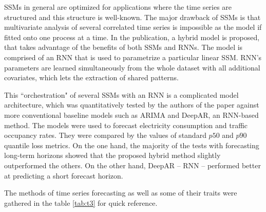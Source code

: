 \documentclass[3p,times,procedia]{elsarticle}
\begin{document}
\begin{enumerate}
SSMs in general are optimized for applications where the time series are structured and this structure is well-known. The major drawback of SSMs is that multivariate analysis of several correlated time series is impossible as the model if fitted onto one process at a time. In the publication, a hybrid model is proposed, that takes advantage of the benefits of both SSMs and RNNs. The model is comprised of an RNN that is used to parametrize a particular linear SSM. RNN's parameters are learned simultaneously from the whole dataset with all additional covariates, which lets the extraction of shared patterns.

This ``orchestration" of several SSMs with an RNN is a complicated model architecture, which was quantitatively tested by the authors of the paper \cite{rangapuram2018deep} against more conventional baseline models such as ARIMA and DeepAR, an RNN-based method. The models were used to forecast electricity consumption and traffic occupancy rates. They were compared by the values of standard $p50$ and $p90$ quantile loss metrics. On the one hand, the majority of the tests with forecasting long-term horizons showed that the proposed hybrid method slightly outperformed the others. On the other hand, DeepAR -- RNN -- performed better at predicting a short forecast horizon.
\end{enumerate}

The methods of time series forecasting as well as some of their traits were gathered in the table \ref{tab:t3} for quick reference.
\end{document}
